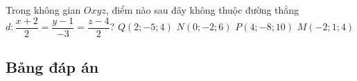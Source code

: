 	\begin{ex}%
		Trong không gian $ Oxyz$, điểm nào sau đây không thuộc đường thẳng
		$ d\colon \dfrac{x+2}{2}=\dfrac{y-1}{-3}=\dfrac{z-4}{2}$?
		\choice
		{\True $Q\left(2;-5;4\right)$}
		{$N\left(0;-2;6\right)$}
		{$P\left(4;-8;10\right)$}
		{$M\left(-2;1;4\right)$}
\end{ex}
\subsection{Bảng đáp án}


